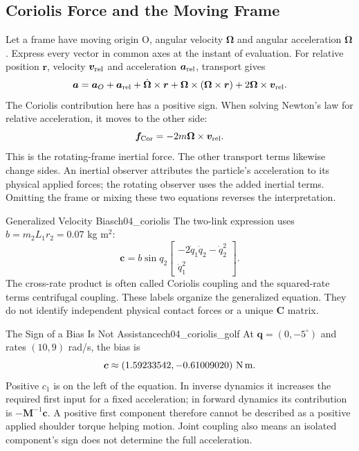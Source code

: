 \subsection*{Coriolis Force and the Moving Frame}

Let a frame have moving origin O, angular velocity \(\bm\Omega\) and angular acceleration \(\dot{\bm\Omega}\). Express every vector in common axes at the instant of evaluation. For relative position \(\bm r\), velocity \(\bm v_{\rm rel}\) and acceleration \(\bm a_{\rm rel}\), transport gives
\[
\bm a=\bm a_O+\bm a_{\rm rel}
+\dot{\bm\Omega}\times\bm r
+\bm\Omega\times(\bm\Omega\times\bm r)
+2\bm\Omega\times\bm v_{\rm rel}.
\]
The Coriolis contribution here has a positive sign. When solving Newton's law for relative acceleration, it moves to the other side:
\begin{equation}
\bm f_{\rm Cor}=-2m\bm\Omega\times\bm v_{\rm rel}.
\label{eq:ch04_coriolis_accel}
\end{equation}
This is the rotating-frame inertial force. The other transport terms likewise change sides. An inertial observer attributes the particle's acceleration to its physical applied forces; the rotating observer uses the added inertial terms. Omitting the frame or mixing these two equations reverses the interpretation.

\begin{definition}{Generalized Velocity Bias}{ch04_coriolis}
The two-link expression uses \(b=m_2L_1r_2=0.07\) kg m\(^2\):
\[
\bm c=b\sin q_2
\begin{bmatrix}-2\dot q_1\dot q_2-\dot q_2^2\\ \dot q_1^2\end{bmatrix}.
\]
The cross-rate product is often called Coriolis coupling and the squared-rate terms centrifugal coupling. These labels organize the generalized equation. They do not identify independent physical contact forces or a unique \(\bm C\) matrix.
\end{definition}

\begin{example}{The Sign of a Bias Is Not Assistance}{ch04_coriolis_golf}
At \(\bm q=(0,-5^\circ)\) and rates \((10,9)\) rad/s, the bias is
\[
\bm c\approx(1.59233542,-0.61009020)\ {\rm N\,m}.
\]
Positive \(c_1\) is on the left of the equation. In inverse dynamics it increases the required first input for a fixed acceleration; in forward dynamics its contribution is \(-\bm M^{-1}\bm c\). A positive first component therefore cannot be described as a positive applied shoulder torque helping motion. Joint coupling also means an isolated component's sign does not determine the full acceleration.
\end{example}

